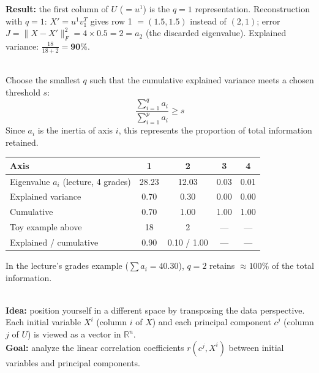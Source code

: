 \documentclass[10pt,a4paper]{article}
\begin{document}
\textbf{Result:} the first column of $U$ ($= u^1$) is the $q = 1$ representation. Reconstruction with $q = 1$: $X' = u^1 v_1^T$ gives row 1 $= (1.5, 1.5)$ instead of $(2, 1)$; error $J = \|X - X'\|_F^2 = 4 \times 0.5 = 2 = a_2$ (the discarded eigenvalue). Explained variance: $\frac{18}{18+2} = \mathbf{90\%}$.

\vspace{8pt}

\\[4pt]
Choose the smallest $q$ such that the cumulative explained variance meets a chosen threshold $s$:
\[
\frac{\sum_{i=1}^q a_i}{\sum_{i=1}^p a_i} \ge s
\]
Since $a_i$ is the inertia of axis $i$, this represents the proportion of total information retained.
\begin{center}
\small
\begin{tabular}{lcccc}
\toprule
\rowcolor{lightbg}
\textbf{Axis} & 1 & 2 & 3 & 4 \\
\midrule
Eigenvalue $a_i$ (lecture, 4 grades) & 28.23 & 12.03 & 0.03 & 0.01 \\
Explained variance & 0.70 & 0.30 & 0.00 & 0.00 \\
Cumulative & 0.70 & 1.00 & 1.00 & 1.00 \\
\midrule
Toy example above & 18 & 2 & --- & --- \\
Explained / cumulative & 0.90 & 0.10 / 1.00 & --- & --- \\
\bottomrule
\end{tabular}
\end{center}
\vspace{-2pt}
\noindent In the lecture's grades example ($\sum a_i = 40.30$), $q = 2$ retains $\approx 100\%$ of the total information.


\\[4pt]
\textbf{Idea:} position yourself in a different space by transposing the data perspective. Each initial variable $X^i$ (column $i$ of $X$) and each principal component $c^j$ (column $j$ of $U$) is viewed as a vector in $\mathbb{R}^n$.\\[4pt]
\textbf{Goal:} analyze the linear correlation coefficients $r(c^j, X^i)$ between initial variables and principal components.
\end{document}
